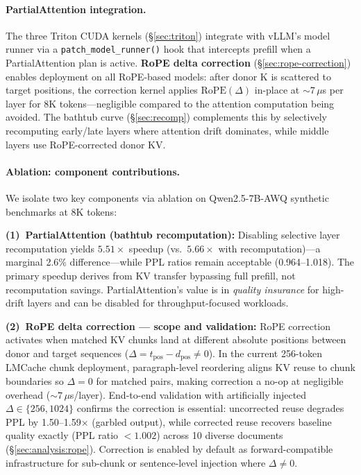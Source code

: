 \documentclass[10pt,twocolumn]{article}
\begin{document}
\paragraph{PartialAttention integration.}
The three Triton CUDA kernels (\S\ref{sec:triton}) integrate with vLLM's
model runner via a \texttt{patch\_model\_runner()} hook
that intercepts prefill when a PartialAttention plan is active. \textbf{RoPE delta correction}
(\S\ref{sec:rope-correction}) enables deployment on all RoPE-based
models: after donor K is scattered to target positions, the correction
kernel applies $\text{RoPE}(\Delta)$ in-place at ${\sim}7\,\mu$s
per layer for 8K tokens---negligible compared to the attention
computation being avoided. The bathtub curve (\S\ref{sec:recomp})
complements this by selectively recomputing early/late layers where
attention drift dominates, while middle layers use RoPE-corrected
donor KV.

\paragraph{Ablation: component contributions.}
We isolate two key components via ablation on Qwen2.5-7B-AWQ
synthetic benchmarks at 8K tokens:

\textbf{(1)~PartialAttention (bathtub recomputation):}
Disabling selective layer recomputation yields $5.51\times$ speedup
(vs.\ $5.66\times$ with recomputation)---a marginal 2.6\% difference---while
PPL ratios remain acceptable (0.964--1.018). The primary speedup
derives from KV transfer bypassing full prefill, not recomputation
savings. PartialAttention's value is in \emph{quality insurance}
for high-drift layers and can be disabled for throughput-focused
workloads.

\textbf{(2)~RoPE delta correction --- scope and validation:}
RoPE correction activates when matched KV chunks land at different
absolute positions between donor and target sequences
($\Delta = t_{\text{pos}} - d_{\text{pos}} \neq 0$).
In the current 256-token LMCache chunk deployment, paragraph-level reordering
aligns KV reuse to chunk boundaries so $\Delta{=}0$ for matched pairs,
making correction a no-op at negligible overhead (${\sim}7\,\mu$s/layer).
End-to-end validation with artificially injected $\Delta \in \{256, 1024\}$
confirms the correction is essential: uncorrected reuse degrades PPL by
1.50--1.59$\times$ (garbled output), while corrected reuse recovers
baseline quality exactly (PPL ratio $< 1.002$) across 10 diverse documents
(\S\ref{sec:analysis:rope}).
Correction is enabled by default as forward-compatible infrastructure
for sub-chunk or sentence-level injection where $\Delta{\neq}0$.
\end{document}
